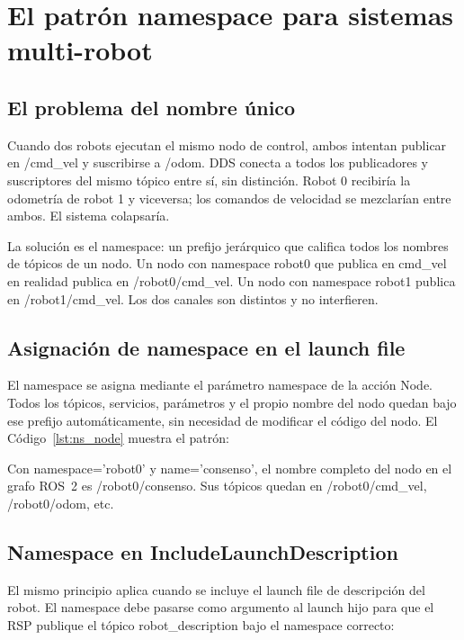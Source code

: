 \section{El patrón namespace para sistemas multi-robot}

\subsection{El problema del nombre único}

Cuando dos robots ejecutan el mismo nodo de control, ambos intentan publicar en /cmd\_vel y suscribirse a /odom. DDS conecta a todos los publicadores y suscriptores del mismo tópico entre sí, sin distinción. Robot 0 recibiría la odometría de robot 1 y viceversa; los comandos de velocidad se mezclarían entre ambos. El sistema colapsaría.

La solución es el namespace: un prefijo jerárquico que califica todos los nombres de tópicos de un nodo. Un nodo con namespace robot0 que publica en cmd\_vel en realidad publica en /robot0/cmd\_vel. Un nodo con namespace robot1 publica en /robot1/cmd\_vel. Los dos canales son distintos y no interfieren.

\subsection{Asignación de namespace en el launch file}

El namespace se asigna mediante el parámetro namespace de la acción Node. Todos los tópicos, servicios, parámetros y el propio nombre del nodo quedan bajo ese prefijo automáticamente, sin necesidad de modificar el código del nodo. El Código~\ref{lst:ns_node} muestra el patrón:



Con namespace='robot0' y name='consenso', el nombre completo del nodo en el grafo ROS~2 es /robot0/consenso. Sus tópicos quedan en /robot0/cmd\_vel, /robot0/odom, etc.

\subsection{Namespace en IncludeLaunchDescription}

El mismo principio aplica cuando se incluye el launch file de descripción del robot. El namespace debe pasarse como argumento al launch hijo para que el RSP publique el tópico robot\_description bajo el namespace correcto:



